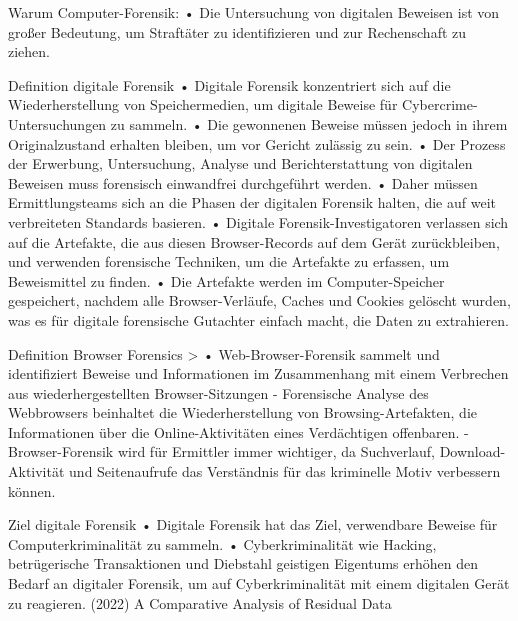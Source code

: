 
Warum Computer-Forensik: \cite{Mahlous.2020}
	•	Die Untersuchung von digitalen Beweisen ist von großer Bedeutung, um Straftäter zu identifizieren und zur Rechenschaft zu ziehen.


Definition digitale Forensik \cite{Izzati.2022}
	•	Digitale Forensik konzentriert sich auf die Wiederherstellung von Speichermedien, um digitale Beweise für Cybercrime-Untersuchungen zu sammeln.
	•	Die gewonnenen Beweise müssen jedoch in ihrem Originalzustand erhalten bleiben, um vor Gericht zulässig zu sein.
	•	Der Prozess der Erwerbung, Untersuchung, Analyse und Berichterstattung von digitalen Beweisen muss forensisch einwandfrei durchgeführt werden.
	•	Daher müssen Ermittlungsteams sich an die Phasen der digitalen Forensik halten, die auf weit verbreiteten Standards basieren.
	•	Digitale Forensik-Investigatoren verlassen sich auf die Artefakte, die aus diesen Browser-Records auf dem Gerät zurückbleiben, und verwenden forensische Techniken, um die Artefakte zu erfassen, um Beweismittel zu finden.
	•	Die Artefakte werden im Computer-Speicher gespeichert, nachdem alle Browser-Verläufe, Caches und Cookies gelöscht wurden, was es für digitale forensische Gutachter einfach macht, die Daten zu extrahieren.


Definition Browser Forensics
	> \cite{Mahlous.2020} 
		•	Web-Browser-Forensik sammelt und identifiziert Beweise und Informationen im Zusammenhang mit einem Verbrechen aus wiederhergestellten Browser-Sitzungen
		-	Forensische Analyse des Webbrowsers beinhaltet die Wiederherstellung von Browsing-Artefakten, die Informationen über die Online-Aktivitäten eines Verdächtigen offenbaren.
		-	Browser-Forensik wird für Ermittler immer wichtiger, da Suchverlauf, Download-Aktivität und Seitenaufrufe das Verständnis für das kriminelle Motiv verbessern können.
		
Ziel digitale Forensik \cite{Izzati.2022}
	•	Digitale Forensik hat das Ziel, verwendbare Beweise für Computerkriminalität zu sammeln.
	•	Cyberkriminalität wie Hacking, betrügerische Transaktionen und Diebstahl geistigen Eigentums erhöhen den Bedarf an digitaler Forensik, um auf Cyberkriminalität mit einem digitalen Gerät zu reagieren. (2022) A Comparative Analysis of Residual Data




